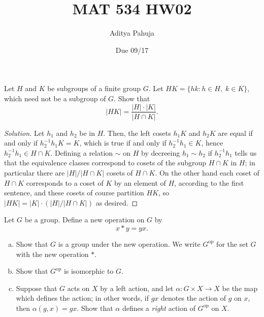\documentclass[10pt]{article}
\title{MAT 534 HW02}
\author{\large Aditya Pahuja}
\date{\large Due 09/17}
\providecommand{\ii}{\item}
\providecommand{\inv}{^{-1}}
\newenvironment{soln}{\begin{proof}[Solution]}{\end{proof}}
\providecommand{\abs}[1]{\left|#1\right|}
\begin{document}
\maketitle

\begin{problem}
    Let $H$ and $K$ be subgroups of a finite group $G$.
    Let $HK = \{hk : h\in H,\; k\in K\}$, which need not be a subgroup of $G$.
    Show that
    \begin{equation*}
	\abs{HK} = \frac{\abs H\cdot\abs K}{\abs{H\cap K}}.
    \end{equation*}
\end{problem}

\begin{soln}
    Let $h_1$ and $h_2$ be in $H$. Then, the left cosets $h_1K$ and $h_2K$
    are equal if and only if $h_2\inv h_1K = K$, which is true if and only if
    $h_2\inv h_1\in K$, hence $h_2\inv h_1\in H\cap K$.
    Defining a relation $\sim$ on $H$ by decreeing $h_1\sim h_2$ if $h_2\inv h_1$
    tells us that the equivalence classes correspond to cosets of
    the subgroup $H\cap K$ in $H$; in particular there are
    $\abs H/\abs{H\cap K}$ cosets of $H\cap K$.
    On the other hand each coset of $H\cap K$ corresponds to a coset of $K$
    by an element of $H$, according to the first sentence, and these cosets
    of course partition $HK$, so $\abs{HK} = \abs{K}\cdot (\abs H/\abs{H\cap K})$
    as desired.
\end{soln}

\begin{problem}
    Let $G$ be a group. Define a new operation on $G$ by
    \begin{equation*}
        x*y = yx.
    \end{equation*}
    \begin{enumerate}[(a)]
        \ii Show that $G$ is a group under the new operation.
	We write $G^{\text{op}}$ for the set $G$ with the new operation $*$.
	\ii Show that $G^{\text{op}}$ is isomorphic to $G$.
	\ii Suppose that $G$ acts on $X$ by a left action,
	and let $\alpha\colon G\times X\to X$ be the map which defines the action;
	in other words, if $gx$ denotes the action of $g$ on $x$, then
	$\alpha(g,x) = gx$. Show that $\alpha$ defines a
	\emph{right} action of $G^{\text{op}}$ on $X$.
    \end{enumerate}
\end{problem}
\end{document}
